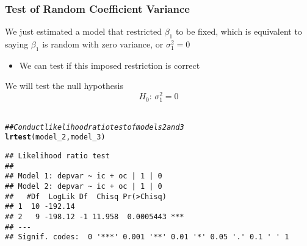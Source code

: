 \documentclass{beamer}\usepackage[]{graphicx}\usepackage[]{color}
\makeatletter
\newcommand{\hlcom}[1]{\textcolor[rgb]{0.678,0.584,0.686}{\textit{#1}}}%
\newcommand{\hlstd}[1]{\textcolor[rgb]{0.345,0.345,0.345}{#1}}%
\newcommand{\hlkwd}[1]{\textcolor[rgb]{0.737,0.353,0.396}{\textbf{#1}}}%
\newenvironment{kframe}{%
 \def\at@end@of@kframe{}%
 \ifinner\ifhmode%
  \def\at@end@of@kframe{\end{minipage}}%
  \begin{minipage}{\columnwidth}%
 \fi\fi%
 \def\FrameCommand##1{\hskip\@totalleftmargin \hskip-\fboxsep
 \colorbox{shadecolor}{##1}\hskip-\fboxsep
     \hskip-\linewidth \hskip-\@totalleftmargin \hskip\columnwidth}%
 \MakeFramed {\advance\hsize-\width
   \@totalleftmargin\z@ \linewidth\hsize
   \@setminipage}}%
 {\par\unskip\endMakeFramed%
 \at@end@of@kframe}
\newenvironment{knitrout}{}{} %
\makeatother
\begin{document}
\begin{frame}[fragile]\frametitle{Test of Random Coefficient Variance}
	We just estimated a model that restricted $\beta_1$ to be fixed, which is equivalent to saying $\beta_1$ is random with zero variance, or $\sigma_1^2 = 0$
	\begin{itemize}
		\item We can test if this imposed restriction is correct
	\end{itemize}
    \vspace{3ex}
    We will test the null hypothesis
    $$H_0 \text{: } \sigma_1^2 = 0$$ \\
\begin{knitrout}\footnotesize
{}\color{fgcolor}\begin{kframe}
\begin{alltt}
\hlcom{## Conduct likelihood ratio test of models 2 and 3}
\hlkwd{lrtest}\hlstd{(model_2, model_3)}
\end{alltt}
\begin{verbatim}
## Likelihood ratio test
## 
## Model 1: depvar ~ ic + oc | 1 | 0
## Model 2: depvar ~ ic + oc | 1 | 0
##   #Df  LogLik Df  Chisq Pr(>Chisq)    
## 1  10 -192.14                         
## 2   9 -198.12 -1 11.958  0.0005443 ***
## ---
## Signif. codes:  0 '***' 0.001 '**' 0.01 '*' 0.05 '.' 0.1 ' ' 1
\end{verbatim}
\end{kframe}
\end{knitrout}
\end{frame}
\end{document}
